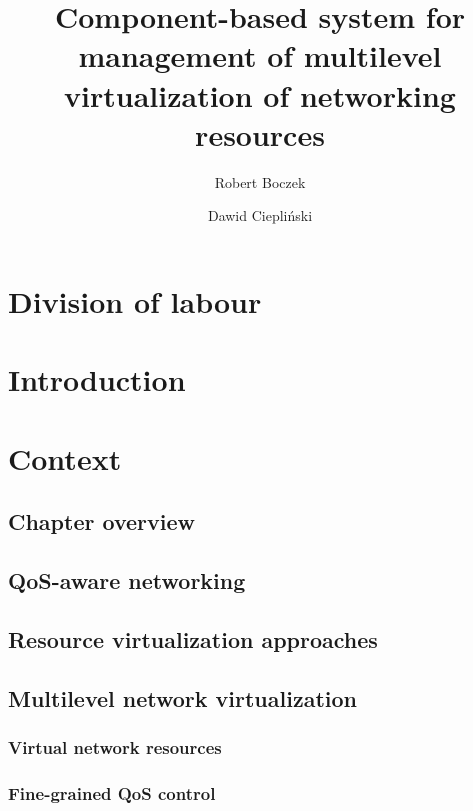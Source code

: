 \documentclass[11pt]{book}
\title{Component-based system for management of multilevel virtualization of networking resources}
\author{Robert Boczek \and Dawid Ciepliński}
\begin{document}
  \maketitle
    
  \tableofcontents

  \chapter*{Division of labour} %
	

  \chapter{Introduction}



  \chapter{Context}  %

    \section*{Chapter overview}


    \section{QoS-aware networking}



    \section{Resource virtualization approaches}


    \section{Multilevel network virtualization}

      \subsection{Virtual network resources}

      \subsection{Fine-grained QoS control}
\end{document}
